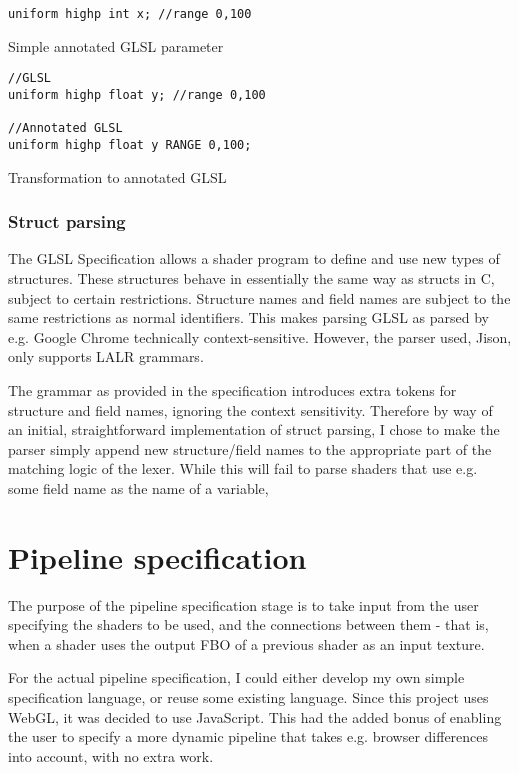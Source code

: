 \documentclass[12pt,twoside,notitlepage]{report}
\begin{document}
\begin{listing}
\label{unannotated}
\begin{verbatim}
uniform highp int x; //range 0,100
\end{verbatim}
\caption{Simple annotated GLSL parameter}
\end{listing}

\begin{listing}
\label{annotated}
\begin{verbatim}
//GLSL
uniform highp float y; //range 0,100

//Annotated GLSL
uniform highp float y RANGE 0,100;
\end{verbatim}
\caption{Transformation to annotated GLSL}
\end{listing}

\subsubsection{Struct parsing}
\label{struct-parse}
The GLSL Specification \cite{glsl-spec} allows a shader program to define and use new types of structures. These structures behave in essentially the same way as structs in C, subject to certain restrictions. Structure names and field names are subject to the same restrictions as normal identifiers. This makes parsing GLSL as parsed by e.g. Google Chrome technically context-sensitive. However, the parser used, Jison, only supports LALR grammars.

The grammar as provided in the specification introduces extra tokens for structure and field names, ignoring the context sensitivity. Therefore by way of an initial, straightforward implementation of struct parsing, I chose to make the parser simply append new structure/field names to the appropriate part of the matching logic of the lexer. While this will fail to parse shaders that use e.g. some field name as the name of a variable, 

\section{Pipeline specification}
The purpose of the pipeline specification stage is to take input from the user specifying the shaders to be used, and the connections between them - that is, when a shader uses the output FBO of a previous shader as an input texture.

For the actual pipeline specification, I could either develop my own simple specification language, or reuse some existing language. Since this project uses WebGL, it was decided to use JavaScript. This had the added bonus of enabling the user to specify a more dynamic pipeline that takes e.g. browser differences into account, with no extra work.
\end{document}
